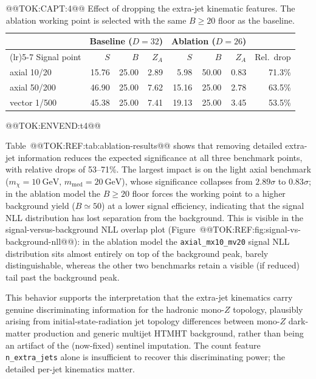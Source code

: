 \documentclass[11pt]{article}
\newcommand{\GeV}{\text{GeV}}
\begin{document}
\begin{table}[t]
  \centering
  \caption{@@TOK:CAPT:4@@ Effect of dropping the extra-jet kinematic features. The ablation
  working point is selected with the same $B\geq20$ floor as the baseline.}
  \label{tab:ablation-results}
  \begin{tabular}{>{\raggedright\arraybackslash}p{2.6cm}rrrrrrr}
    \toprule
    & \multicolumn{3}{c}{Baseline ($D=32$)} & \multicolumn{3}{c}{Ablation ($D=26$)} & \\
    \cmidrule(lr){2-4}\cmidrule(lr){5-7}
    Signal point & $S$ & $B$ & $Z_A$ & $S$ & $B$ & $Z_A$ & Rel.\ drop \\
    \midrule
    axial 10/20  & 15.76 & 25.00 & 2.89 & 5.98  & 50.00 & 0.83 & 71.3\% \\
    axial 50/200 & 46.90 & 25.00 & 7.62 & 15.16 & 25.00 & 2.78 & 63.5\% \\
    vector 1/500 & 45.38 & 25.00 & 7.41 & 19.13 & 25.00 & 3.45 & 53.5\% \\
    \bottomrule
  \end{tabular}
@@TOK:ENVEND:t4@@\end{table}

Table~@@TOK:REF:tab:ablation-results@@ shows that removing detailed extra-jet
information reduces the expected significance at all three benchmark points,
with relative drops of 53--71\%. The largest impact is on the light axial
benchmark ($m_\chi=10~\GeV$, $m_{\mathrm{med}}=20~\GeV$), whose significance
collapses from $2.89\sigma$ to $0.83\sigma$; in the ablation model the
$B\geq20$ floor forces the working point to a higher background yield
($B\simeq50$) at a lower signal efficiency, indicating that the signal NLL
distribution has lost separation from the background. This is visible in
the signal-versus-background NLL overlap plot
(Figure~@@TOK:REF:fig:signal-vs-background-nll@@): in the ablation model the
\texttt{axial\_mx10\_mv20} signal NLL distribution sits almost entirely on
top of the background peak, barely distinguishable, whereas the other two
benchmarks retain a visible (if reduced) tail past the background peak.

This behavior supports the interpretation that the extra-jet kinematics
carry genuine discriminating information for the hadronic mono-$Z$ topology,
plausibly arising from initial-state-radiation jet topology differences
between mono-$Z$ dark-matter production and generic multijet HTMHT
background, rather than being an artifact of the (now-fixed) sentinel
imputation. The count feature \texttt{n\_extra\_jets} alone is
insufficient to recover this discriminating power; the detailed per-jet
kinematics matter.
\end{document}
